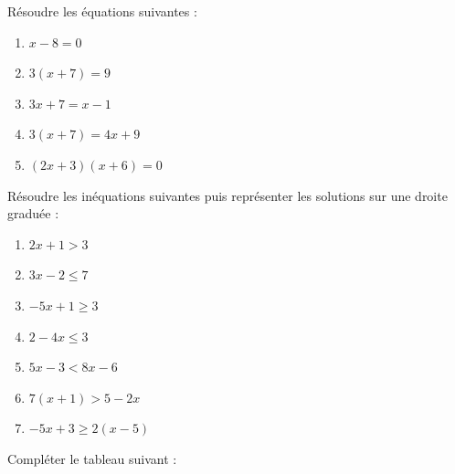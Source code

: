 \dotfill

\bigskip


\exo

Résoudre les équations suivantes :

\begin{enumerate}
\item $x-8=0$
\item $3(x+7)=9$
\item $3x+7=x-1$
\item $3(x+7)=4x+9$
\item $(2x+3)(x+6)=0$
\end{enumerate}


\medskip


\exo

Résoudre les inéquations suivantes puis représenter les solutions sur une droite graduée :

\begin{enumerate}
\item $2x+1>3$
\item $3x-2\leqslant 7$
\item $-5x+1\geqslant 3$
\item $2-4x\leqslant 3$
\item $5x-3<8x-6$
\item $7(x+1)>5-2x$
\item $-5x+3\geqslant 2(x-5)$
\end{enumerate}


\exo 

Compléter le tableau suivant :

